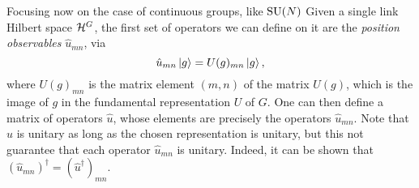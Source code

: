 Focusing now on the case of continuous groups, like $\mathrm{SU}(N)$
Given a single link Hilbert space $\mathcal{H}^G$, the first set of operators we can define on it are the \emph{position observables} $\hat{u}_{mn}$, via
\begin{equation}
    \hat{u}_{mn} \ket{g} = U(g)_{mn} \ket{g},
\end{equation}
where $U(g)_{mn}$ is the matrix element $(m, n)$ of the matrix $U(g)$, which is the image of $g$ in the fundamental representation $U$ of $G$.
One can then define a matrix of operators $\hat{u}$, whose elements are precisely the operators $\hat{u}_{mn}$.
Note that $\hat{u}$ is unitary as long as the chosen representation is unitary, but this not guarantee that each operator $\hat{u}_{mn}$ is unitary.
Indeed, it can be shown that $(\hat{u}_{mn})^{\dagger} = (\hat{u}^{\dagger})_{mn}$.
